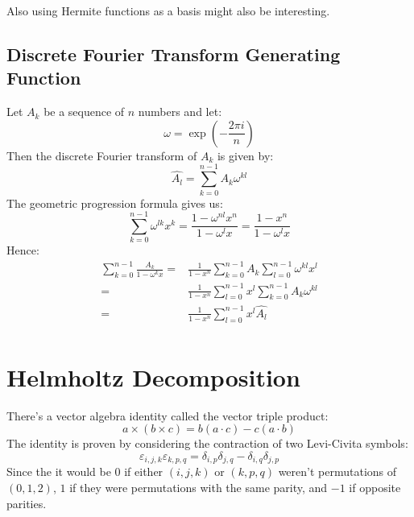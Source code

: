 Also using Hermite functions as a basis might also be interesting.

\subsection{Discrete Fourier Transform Generating Function}
Let $A_k$ be a sequence of $n$ numbers and let:
\[\omega = \exp\left(-\frac{2\pi i }{n}\right)\]
Then the discrete Fourier transform of $A_k$ is given by:
\[\widehat{A_l} = \sum_{k=0}^{n-1}A_k\omega^{kl}\]
The geometric progression formula gives us:
\[\sum_{k=0}^{n-1}\omega^{lk}x^k = \frac{1-\omega^{nl}x^n}{1-\omega^l x}=\frac{1-x^n}{1-\omega^l x}\]
Hence:
\begin{equation*}
\begin{aligned}
	\sum_{k=0}^{n-1}\frac{A_k}{1-\omega^k x} =&\frac{1}{1-x^n}\sum_{k=0}^{n-1}A_k\sum_{l=0}^{n-1}\omega^{kl}x^l \\
	=&\frac{1}{1-x^n}\sum_{l=0}^{n-1}x^l\sum_{k=0}^{n-1}A_k\omega^{kl} \\
	=&\frac{1}{1-x^n}\sum_{l=0}^{n-1}x^l\widehat{A_l} \\
\end{aligned}
\end{equation*}

\section{Helmholtz Decomposition}
There's a vector algebra identity called the vector triple product:
\[a\times(b\times c) = b(a\cdot c)-c(a\cdot b)\]
The identity is proven by considering the contraction of two Levi-Civita symbols:
\[\varepsilon_{i,j,k}\varepsilon_{k,p,q} = \delta_{i,p}\delta_{j,q}-\delta_{i,q}\delta_{j,p}\]
Since the it would be $0$ if either $(i,j,k)$ or $(k,p,q)$ weren't permutations of $(0,1,2)$,
$1$ if they were permutations with the same parity, and $-1$ if opposite parities.
\\

